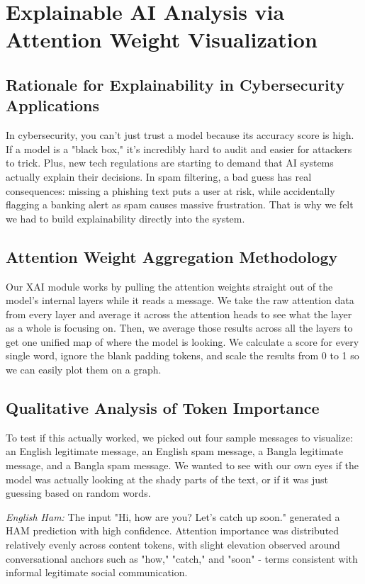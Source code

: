 \documentclass[journal]{IEEEtran}
\begin{document}
\section{Explainable AI Analysis via Attention Weight Visualization}

\subsection{Rationale for Explainability in Cybersecurity Applications}

In cybersecurity, you can't just trust a model because its accuracy score is high. If a model is a "black box," it's incredibly hard to audit and easier for attackers to trick. Plus, new tech regulations are starting to demand that AI systems actually explain their decisions. In spam filtering, a bad guess has real consequences: missing a phishing text puts a user at risk, while accidentally flagging a banking alert as spam causes massive frustration. That is why we felt we had to build explainability directly into the system.

\subsection{Attention Weight Aggregation Methodology}

Our XAI module works by pulling the attention weights straight out of the model's internal layers while it reads a message. We take the raw attention data from every layer and average it across the attention heads to see what the layer as a whole is focusing on. Then, we average those results across all the layers to get one unified map of where the model is looking. We calculate a score for every single word, ignore the blank padding tokens, and scale the results from 0 to 1 so we can easily plot them on a graph.

\subsection{Qualitative Analysis of Token Importance}

To test if this actually worked, we picked out four sample messages to visualize: an English legitimate message, an English spam message, a Bangla legitimate message, and a Bangla spam message. We wanted to see with our own eyes if the model was actually looking at the shady parts of the text, or if it was just guessing based on random words.

\textit{English Ham:} The input "Hi, how are you? Let's catch up soon."
generated a HAM prediction with high confidence. Attention importance
was distributed relatively evenly across content tokens, with slight
elevation observed around conversational anchors such as "how," "catch,"
and "soon" - terms consistent with informal legitimate social
communication.
\end{document}

